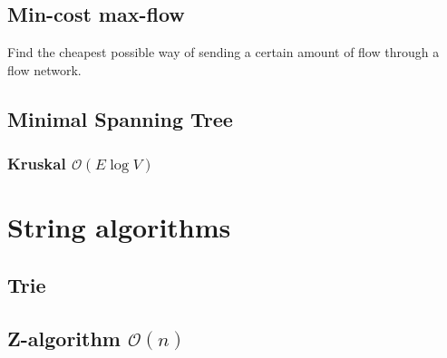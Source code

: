 \documentclass{article}
\begin{document}
\begin{comment}
// http://www.slideshare.net/KuoE0/acmicpc-dinics-algorithm
\end{comment}



\subsection{Min-cost max-flow}

Find the cheapest possible way of sending a certain amount of flow through a flow network.



\subsection{Minimal Spanning Tree}

\begin{comment}
\subsubsection{Prim $\mathcal{O}((E + V) \log V)$}


\end{comment}

\subsubsection{Kruskal $\mathcal{O}(E \log V)$}

\begin{comment}

\end{comment}

\section{String algorithms}

\subsection{Trie}



\subsection{Z-algorithm $\mathcal{O}(n)$}
\end{document}
